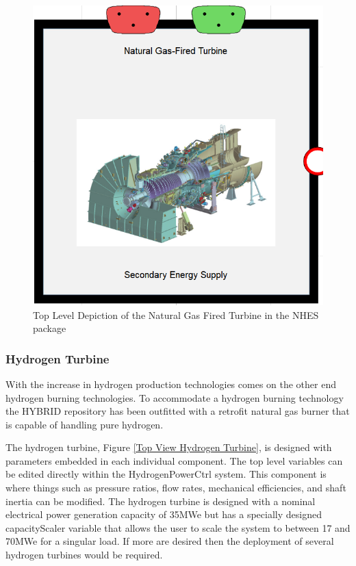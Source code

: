 \begin{figure}[hbtp]
\centering
\includegraphics[scale=0.4]{pics/GasTurbine.png}
\caption{Top Level Depiction of the Natural Gas Fired Turbine in the NHES package}
\label{Top View Gas Turbine}
\end{figure}

\subsubsection{Hydrogen Turbine}
With the increase in hydrogen production technologies comes on the other end hydrogen burning technologies. To accommodate a hydrogen burning technology the HYBRID repository has been outfitted with a retrofit natural gas burner that is capable of handling pure hydrogen. 

The hydrogen turbine, Figure \ref{Top View Hydrogen Turbine}, is designed with parameters embedded in each individual component. The top level variables can be edited directly within the Hydrogen\textunderscore PowerCtrl system. This component is where things such as pressure ratios, flow rates, mechanical efficiencies, and shaft inertia can be modified. The hydrogen turbine is designed with a nominal electrical power generation capacity of 35MWe but has a specially designed capacityScaler variable that allows the user to scale the system to between 17 and 70MWe for a singular load. If more are desired then the deployment of several hydrogen turbines would be required. 


